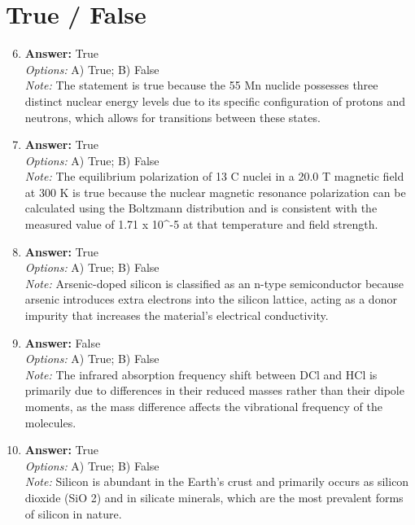 \documentclass[12pt]{article}
\begin{document}
\section*{True / False}
\begin{enumerate}[label=\arabic*.]
\setcounter{enumi}{5}
\item \textbf{Answer:} True
\\ \textit{Options:} A) True; B) False
\\ \textit{Note:} The statement is true because the 55 Mn nuclide possesses three distinct nuclear energy levels due to its specific configuration of protons and neutrons, which allows for transitions between these states.
\item \textbf{Answer:} True
\\ \textit{Options:} A) True; B) False
\\ \textit{Note:} The equilibrium polarization of 13 C nuclei in a 20.0 T magnetic field at 300 K is true because the nuclear magnetic resonance polarization can be calculated using the Boltzmann distribution and is consistent with the measured value of 1.71 x 10^-5 at that temperature and field strength.
\item \textbf{Answer:} True
\\ \textit{Options:} A) True; B) False
\\ \textit{Note:} Arsenic-doped silicon is classified as an n-type semiconductor because arsenic introduces extra electrons into the silicon lattice, acting as a donor impurity that increases the material's electrical conductivity.
\item \textbf{Answer:} False
\\ \textit{Options:} A) True; B) False
\\ \textit{Note:} The infrared absorption frequency shift between DCl and HCl is primarily due to differences in their reduced masses rather than their dipole moments, as the mass difference affects the vibrational frequency of the molecules.
\item \textbf{Answer:} True
\\ \textit{Options:} A) True; B) False
\\ \textit{Note:} Silicon is abundant in the Earth's crust and primarily occurs as silicon dioxide (SiO 2) and in silicate minerals, which are the most prevalent forms of silicon in nature.
\end{enumerate}
\end{document}

